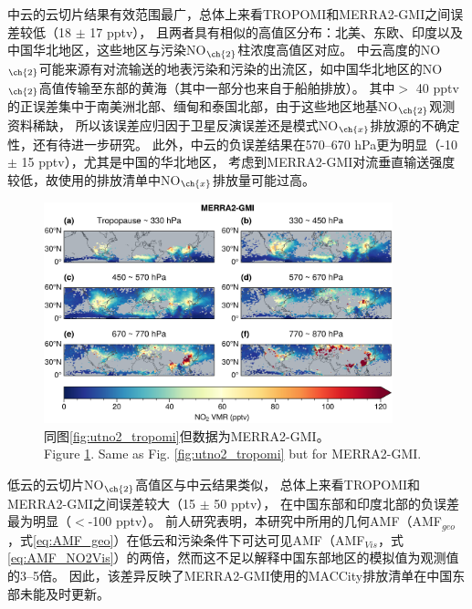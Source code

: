 中云的云切片结果有效范围最广，总体上来看TROPOMI和MERRA2-GMI之间误差较低（18 $\pm$ 17 pptv），
且两者具有相似的高值区分布：北美、东欧、印度以及中国华北地区，这些地区与污染NO$_{\ch{2}}$柱浓度高值区对应。
中云高度的NO$_{\ch{2}}$可能来源有对流输送的地表污染和污染的出流区，如中国华北地区的NO$_{\ch{2}}$高值传输至东部的黄海（其中一部分也来自于船舶排放）。
其中$>$ 40 pptv的正误差集中于南美洲北部、缅甸和泰国北部，由于这些地区地基NO$_{\ch{2}}$观测资料稀缺，
所以该误差应归因于卫星反演误差还是模式NO$_{\ch{x}}$排放源的不确定性，还有待进一步研究。
此外，中云的负误差结果在570--670 hPa更为明显（-10 $\pm$ 15 pptv），尤其是中国的华北地区，
考虑到MERRA2-GMI对流垂直输送强度较低，故使用的排放清单中NO$_{\ch{x}}$排放量可能过高\citep{Ziemke.2019}。

\begin{figure}[H]
    \centering
    \includegraphics[width=0.9\textwidth]{./figures/utno2_merra2-gmi.png}
    \caption{
    同图\ref{fig:utno2_tropomi}但数据为MERRA2-GMI。 \\
    Figure \ref{fig:utno2_merra2}. Same as Fig. \ref{fig:utno2_tropomi} but for MERRA2-GMI.
    }
    \label{fig:utno2_merra2}
\end{figure}

低云的云切片NO$_{\ch{2}}$高值区与中云结果类似，
总体上来看TROPOMI和MERRA2-GMI之间误差较大（15 $\pm$ 50 pptv），
在中国东部和印度北部的负误差最为明显（$<$-100 pptv）。
前人研究表明，本研究中所用的几何AMF（AMF$_{geo}$，式\ref{eq:AMF_geo}）在低云和污染条件下可达可见AMF（AMF$_{Vis}$，式\ref{eq:AMF_NO2Vis}）的两倍\citep{BelmonteRivas.2015}，然而这不足以解释中国东部地区的模拟值为观测值的3--5倍。
因此，该差异反映了MERRA2-GMI使用的MACCity排放清单在中国东部未能及时更新。


